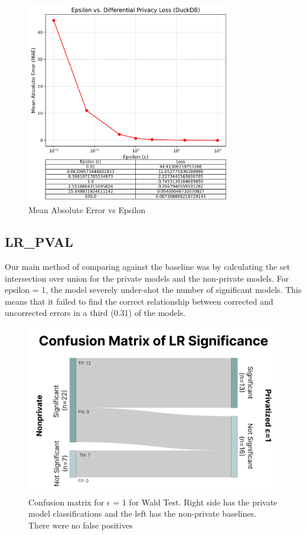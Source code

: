 \documentclass[12pt,letterpaper]{article}
\begin{document}
\begin{figure}[H]
    \centering
    \includegraphics[width=0.8\textwidth]{figure/epsilon_vs_loss.png}
    \caption{Mean Absolute Error vs Epsilon}
    \label{fig:epsilon_vs_loss}
\end{figure}

\subsection{LR\_PVAL}
Our main method of comparing against the baseline was by calculating the set intersection over union for the private models and the non-private models. For epsilon = 1, the model severely under-shot the number of significant models. This means that it failed to find the correct relationship between corrected and uncorrected errors in a third (0.31) of the models.

\begin{figure}[H]
\centering
\includegraphics[width=.85\linewidth]{figure/conf_matrix.png}
\caption{Confusion matrix for $\epsilon$ = 1 for Wald Test. Right side has the private model classifications and the left has the non-private baselines. There were no false positives}
\label{fig:conf_matrix}
\end{figure}
\end{document}
